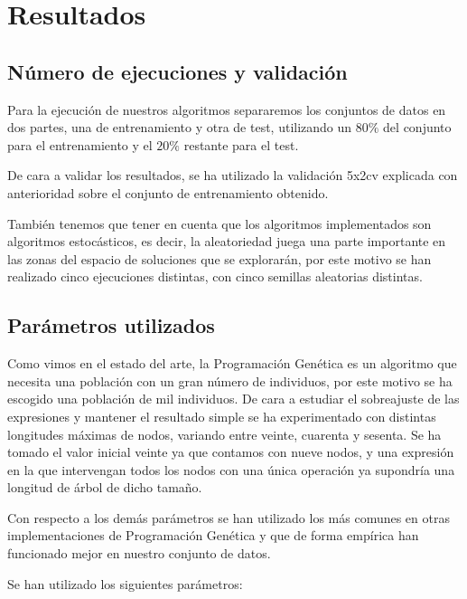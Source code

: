 \section{Resultados}

\subsection{Número de ejecuciones y validación}

Para la ejecución de nuestros algoritmos separaremos los conjuntos de datos en dos partes, una de entrenamiento y otra de test, utilizando un $80\%$ del conjunto para el entrenamiento y el $20\%$ restante para el test.

De cara a validar los resultados, se ha utilizado la validación 5x2cv explicada con anterioridad sobre el conjunto de entrenamiento obtenido.

También tenemos que tener en cuenta que los algoritmos implementados son algoritmos estocásticos, es decir, la aleatoriedad juega una parte importante en las zonas del espacio de soluciones que se explorarán, por este motivo se han realizado cinco ejecuciones distintas, con cinco semillas aleatorias distintas.

\subsection{Parámetros utilizados}

Como vimos en el estado del arte, la Programación Genética es un algoritmo que necesita una población con un gran número de individuos, por este motivo se ha escogido una población de mil individuos. De cara a estudiar el sobreajuste de las expresiones y mantener el resultado simple se ha experimentado con distintas longitudes máximas de nodos, variando entre veinte, cuarenta y sesenta. Se ha tomado el valor inicial veinte ya que contamos con nueve nodos, y una expresión en la que intervengan todos los nodos con una única operación ya supondría una longitud de árbol de dicho tamaño.

Con respecto a los demás parámetros se han utilizado los más comunes en otras implementaciones de Programación Genética y que de forma empírica han funcionado mejor en nuestro conjunto de datos.

Se han utilizado los siguientes parámetros:

